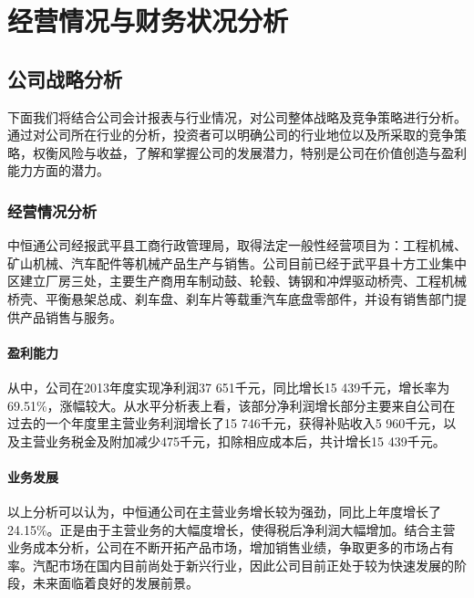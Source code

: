 
\chapter{经营情况与财务状况分析}{}
\label{chap02}

\section{公司战略分析}{}

下面我们将结合公司会计报表与行业情况，对公司整体战略及竞争策略进行分析。通过对公司所在行业的分析，投资者可以明确公司的行业地位以及所采取的竞争策略，权衡风险与收益，了解和掌握公司的发展潜力，特别是公司在价值创造与盈利能力方面的潜力。

\subsection{经营情况分析}{}

中恒通公司经报武平县工商行政管理局，取得法定一般性经营项目为：工程机械、矿山机械、汽车配件等机械产品生产与销售。公司目前已经于武平县十方工业集中区建立厂房三处，主要生产商用车制动鼓、轮毂、铸钢和冲焊驱动桥壳、工程机械桥壳、平衡悬架总成、刹车盘、刹车片等载重汽车底盘零部件，并设有销售部门提供产品销售与服务。

\subsubsection{盈利能力}{}
从中，公司在2013年度实现净利润37 651千元，同比增长15 439千元，增长率为69.51\%，涨幅较大。从水平分析表上看，该部分净利润增长部分主要来自公司在过去的一个年度里主营业务利润增长了15 746千元，获得补贴收入5 960千元，以及主营业务税金及附加减少475千元，扣除相应成本后，共计增长15 439千元。

\subsubsection{业务发展}{}
以上分析可以认为，中恒通公司在主营业务增长较为强劲，同比上年度增长了24.15\%。正是由于主营业务的大幅度增长，使得税后净利润大幅增加。结合主营业务成本分析，公司在不断开拓产品市场，增加销售业绩，争取更多的市场占有率。汽配市场在国内目前尚处于新兴行业，因此公司目前正处于较为快速发展的阶段，未来面临着良好的发展前景。

